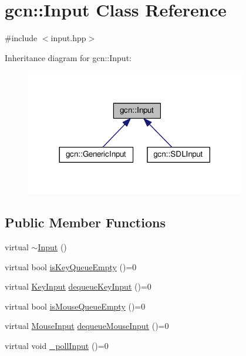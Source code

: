 \hypertarget{classgcn_1_1Input}{}\section{gcn\+:\+:Input Class Reference}
\label{classgcn_1_1Input}


{\ttfamily \#include $<$input.\+hpp$>$}



Inheritance diagram for gcn\+:\+:Input\+:\nopagebreak
\begin{figure}[H]
\begin{center}
\leavevmode
\includegraphics[width=272pt]{classgcn_1_1Input__inherit__graph}
\end{center}
\end{figure}
\subsection*{Public Member Functions}
\begin{DoxyCompactItemize}
\item 
virtual \hyperlink{classgcn_1_1Input_af920d08ad5c187890d2a87cbcfe9e0f7}{$\sim$\+Input} ()
\item 
virtual bool \hyperlink{classgcn_1_1Input_a99c69c2e8d9b4378c4cea1f8beed0cf3}{is\+Key\+Queue\+Empty} ()=0
\item 
virtual \hyperlink{classgcn_1_1KeyInput}{Key\+Input} \hyperlink{classgcn_1_1Input_a3c4c2e5a0328dff6f90d81fb22e30d6c}{dequeue\+Key\+Input} ()=0
\item 
virtual bool \hyperlink{classgcn_1_1Input_a9c59ac0d0ae6c2eb4967f3eb6d9e059f}{is\+Mouse\+Queue\+Empty} ()=0
\item 
virtual \hyperlink{classgcn_1_1MouseInput}{Mouse\+Input} \hyperlink{classgcn_1_1Input_a974c5ffa91c1f80185f32ac10a5de3e2}{dequeue\+Mouse\+Input} ()=0
\item 
virtual void \hyperlink{classgcn_1_1Input_a8e852901ad206985f18ae25e99867cb6}{\+\_\+poll\+Input} ()=0
\end{DoxyCompactItemize}


